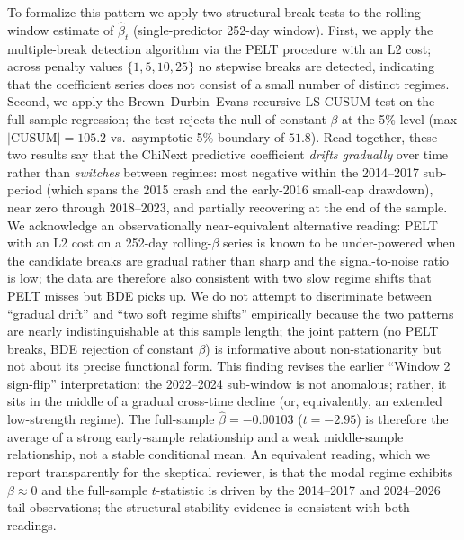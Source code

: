 \documentclass[AER]{AEA}
\begin{document}
To formalize this pattern we apply two structural-break tests to the rolling-window estimate of $\hat\beta_t$ (single-predictor 252-day window). First, we apply the \citet{bai2003computation} multiple-break detection algorithm via the PELT procedure with an L2 cost; across penalty values $\{1, 5, 10, 25\}$ no stepwise breaks are detected, indicating that the coefficient series does not consist of a small number of distinct regimes. Second, we apply the Brown--Durbin--Evans recursive-LS CUSUM test on the full-sample regression; the test rejects the null of constant $\beta$ at the 5\% level (max $|\text{CUSUM}|=105.2$ vs.\ asymptotic 5\% boundary of $51.8$). Read together, these two results say that the ChiNext predictive coefficient \emph{drifts gradually} over time rather than \emph{switches} between regimes: most negative within the 2014--2017 sub-period (which spans the 2015 crash and the early-2016 small-cap drawdown), near zero through 2018--2023, and partially recovering at the end of the sample. We acknowledge an observationally near-equivalent alternative reading: PELT with an L2 cost on a 252-day rolling-$\beta$ series is known to be under-powered when the candidate breaks are gradual rather than sharp and the signal-to-noise ratio is low; the data are therefore also consistent with two slow regime shifts that PELT misses but BDE picks up. We do not attempt to discriminate between ``gradual drift'' and ``two soft regime shifts'' empirically because the two patterns are nearly indistinguishable at this sample length; the joint pattern (no PELT breaks, BDE rejection of constant $\beta$) is informative about non-stationarity but not about its precise functional form. This finding revises the earlier ``Window 2 sign-flip'' interpretation: the 2022--2024 sub-window is not anomalous; rather, it sits in the middle of a gradual cross-time decline (or, equivalently, an extended low-strength regime). The full-sample $\hat\beta = -0.00103$ ($t=-2.95$) is therefore the average of a strong early-sample relationship and a weak middle-sample relationship, not a stable conditional mean. An equivalent reading, which we report transparently for the skeptical reviewer, is that the modal regime exhibits $\beta \approx 0$ and the full-sample $t$-statistic is driven by the 2014--2017 and 2024--2026 tail observations; the structural-stability evidence is consistent with both readings.
\end{document}
